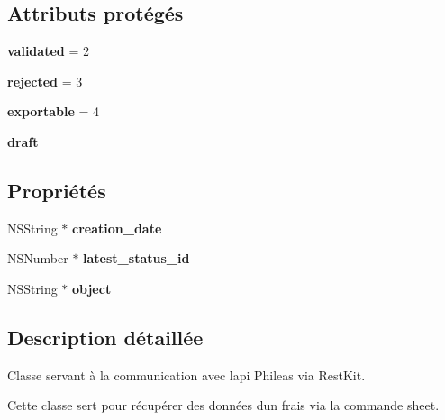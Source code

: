 \subsection*{Attributs protégés}
\begin{DoxyCompactItemize}
\item 
\hypertarget{interface_sheet_ad53acf14ae1f984fe1c58c04d2bf7dff}{}{\bfseries validated} = 2\label{interface_sheet_ad53acf14ae1f984fe1c58c04d2bf7dff}

\item 
\hypertarget{interface_sheet_a451d3e647b731db35287e7bcda70928e}{}{\bfseries rejected} = 3\label{interface_sheet_a451d3e647b731db35287e7bcda70928e}

\item 
\hypertarget{interface_sheet_ab4f2a903cb574a73e1805c210d54c096}{}{\bfseries exportable} = 4\label{interface_sheet_ab4f2a903cb574a73e1805c210d54c096}

\item 
{\bfseries draft}
\end{DoxyCompactItemize}
\subsection*{Propriétés}
\begin{DoxyCompactItemize}
\item 
\hypertarget{interface_sheet_aa48ba276b37be7275e3052536b09fe14}{}N\+S\+String $\ast$ {\bfseries creation\+\_\+date}\label{interface_sheet_aa48ba276b37be7275e3052536b09fe14}

\item 
\hypertarget{interface_sheet_af2e596e0a16e6af9ca165e57388df121}{}N\+S\+Number $\ast$ {\bfseries latest\+\_\+status\+\_\+id}\label{interface_sheet_af2e596e0a16e6af9ca165e57388df121}

\item 
\hypertarget{interface_sheet_a79f248377589d50814ac481de0272a3f}{}N\+S\+String $\ast$ {\bfseries object}\label{interface_sheet_a79f248377589d50814ac481de0272a3f}

\end{DoxyCompactItemize}


\subsection{Description détaillée}
Classe servant à la communication avec l\textquotesingle{}api Phileas via Rest\+Kit. 

Cette classe sert pour récupérer des données d\textquotesingle{}un frais via la commande sheet. 

